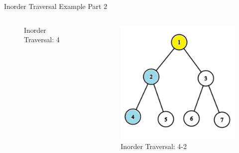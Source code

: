 \documentclass[aspectratio=169]{beamer}%
\begin{document}
\begin{frame}{Inorder Traversal Example Part 2}
\begin{columns}
\begin{column}{0.32\textwidth}
\begin{figure}
                \caption{Inorder Traversal: 4}
            \end{figure}
        \end{column}
        \hfill
        \begin{column}{0.32\textwidth}
            \begin{figure}
                \centering
                \includegraphics[width = .9\linewidth]{tree-in 6.png}
                \caption{Inorder Traversal: 4-2}
            \end{figure}
        \end{column}
    \end{columns}
\end{frame}
\end{document}
